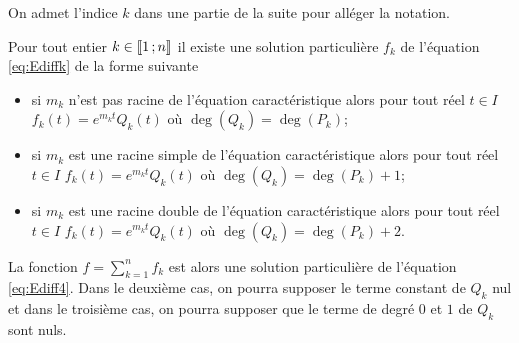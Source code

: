 On admet l'indice \(k\) dans une partie de la suite pour alléger la notation.

\begin{theo}
  Pour tout entier \(k \in \mathopen{\llbracket}1\mathclose{}\mathpunct{};n\mathclose{\rrbracket}\) il existe une solution
  particulière \(f_k\) de l'équation \eqref{eq:Ediffk} de la forme suivante
  \begin{itemize}
    \item si \(m_k\) n'est pas racine de l'équation caractéristique alors
      pour tout réel \(t \in I\) \(f_k(t) = e^{m_k t} Q_k(t)\) où
      \(\deg(Q_k) = \deg(P_k)\);
    \item si \(m_k\) est une racine simple de l'équation caractéristique
      alors pour tout réel \(t \in I\) \(f_k(t) = e^{m_k t} Q_k(t)\) où
      \(\deg(Q_k) = \deg(P_k) + 1\);
    \item si \(m_k\) est une racine double de l'équation caractéristique
      alors pour tout réel \(t \in I\) \(f_k(t) = e^{m_k t} Q_k(t)\) où
      \(\deg(Q_k) = \deg(P_k) + 2\).
  \end{itemize}
  La fonction \(f = \sum_{k = 1}^{n} f_k\) est alors une solution particulière
  de l'équation \eqref{eq:Ediff4}. Dans le deuxième cas, on pourra supposer le
  terme constant de \(Q_k\) nul et dans le troisième cas, on pourra supposer
  que le terme de degré \(0\) et \(1\) de \(Q_k\) sont nuls.
\end{theo}

